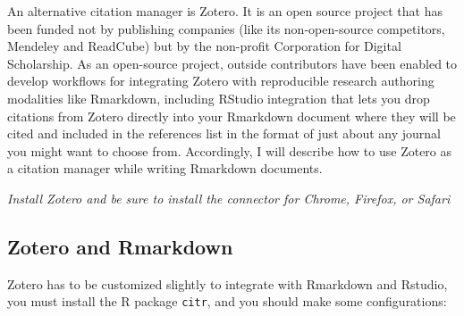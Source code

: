 \documentclass[]{krantz}
\begin{document}
An alternative citation manager is Zotero. It is an open source project that has been funded
not by publishing companies (like its non-open-source competitors, Mendeley and ReadCube) but
by the non-profit Corporation for Digital Scholarship. As an open-source project, outside
contributors have been enabled to develop workflows for integrating Zotero with reproducible
research authoring modalities like Rmarkdown, including RStudio integration that lets you
drop citations from Zotero directly into your Rmarkdown document where they will be cited
and included in the references list in the format of just about any journal you might
want to choose from. Accordingly, I will describe how to use Zotero as a citation manager
while writing Rmarkdown documents.

\emph{Install Zotero and be sure to install the connector for Chrome, Firefox, or Safari}

\hypertarget{zotero-and-rmarkdown}{%
\subsection{Zotero and Rmarkdown}\label{zotero-and-rmarkdown}}

Zotero has to be customized slightly to integrate with Rmarkdown and Rstudio, you must
install the R package \texttt{citr}, and you should make some configurations:
\end{document}
